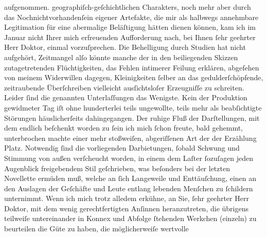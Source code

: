 \begin{ledgroupsized}[t]{13cm}
{{{                        aufgenommen.}}}\label{K_L01792_1h} geographiſch-geſchichtlichen Charakters, noch mehr aber
                    durch das Nochnichtvorhandenſein eigener Artefakte, die mir als halbwegs
                    annehmbare Legitimation für eine abermalige Beläſtigung hätten dienen können,
                    kam ich im Januar nicht Ihrer mich erfreuenden Aufforderung nach,
                    bei Ihnen ſehr geehrter Herr Doktor, einmal vorzuſprechen. Die Behelligung durch
                    Studien hat nicht aufgehört, Zeitmangel alſo könnte manche der in den
                    beiliegenden Skizzen zutagetretenden Flüchtigkeiten, das Fehlen intimerer
                    Feilung erklären, {\pb}abgeſehen von
                    meinem Widerwillen dagegen, Kleinigkeiten ſelber an das gedulderſchöpfende,
                    zeitraubende Überſchreiben vielleicht ausſichtsloſer Erzeugniſſe zu schreiten.
                    Leider ſind die genannten Unterlaſſungen das Wenigste. Kein der Produktion
                    gewidmeter Tag iſt ohne hunderterlei teils ungewollte, teils mehr als
                    beabſichtigte Störungen häuslicherſeits dahingegangen. Der ruhige Fluß der
                    Darſtellungen, mit dem endlich beſchenkt worden zu ſein ich mich ſchon freute,
                    bald gehemmt, unterbrochen machte einer mehr stoßweiſen, abgeriſſenen Art der
                    der Erzählung Platz. Notwendig ſind die vorliegenden Darbietungen,
                    ſobald Schwung {\pb}und Stimmung von
                    außen verſcheucht worden, in einem dem Laſter ſozuſagen jeden Augenblick
                    freigebendem Stil geſchrieben, was beſonders bei der letzten Novellette ermüden muß, welche an ſich
                    Langeweile und Enttäuſchung, einen an den Auslagen der Geſchäfte und Leute
                    entlang lebenden Menſchen zu ſchildern unternimmt. Wenn ich mich trotz alledem
                    erkühne, an Sie, ſehr geehrter Herr Doktor, mit dem wenig gerechtfertigten
                    Anſinnen heranzutreten, die übrigens teilweiſe untereinander in Konnex und
                    Abfolge ſtehenden Werkchen (einzeln) zu beurteilen die Güte zu haben, {\pb}die möglicherweiſe wertvolle \label{K_L01792_2v}
\end{ledgroupsized}
